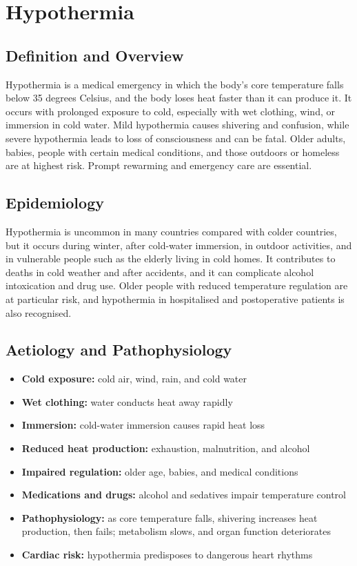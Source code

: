 \chapter{Hypothermia}

\section*{Definition and Overview}
Hypothermia is a medical emergency in which the body's core temperature falls below 35 degrees Celsius, and the body loses heat faster than it can produce it. It occurs with prolonged exposure to cold, especially with wet clothing, wind, or immersion in cold water. Mild hypothermia causes shivering and confusion, while severe hypothermia leads to loss of consciousness and can be fatal. Older adults, babies, people with certain medical conditions, and those outdoors or homeless are at highest risk. Prompt rewarming and emergency care are essential.

\section*{Epidemiology}
Hypothermia is uncommon in many countries compared with colder countries, but it occurs during winter, after cold-water immersion, in outdoor activities, and in vulnerable people such as the elderly living in cold homes. It contributes to deaths in cold weather and after accidents, and it can complicate alcohol intoxication and drug use. Older people with reduced temperature regulation are at particular risk, and hypothermia in hospitalised and postoperative patients is also recognised.

\section*{Aetiology and Pathophysiology}
\begin{itemize}
    \item \textbf{Cold exposure:} cold air, wind, rain, and cold water
    \item \textbf{Wet clothing:} water conducts heat away rapidly
    \item \textbf{Immersion:} cold-water immersion causes rapid heat loss
    \item \textbf{Reduced heat production:} exhaustion, malnutrition, and alcohol
    \item \textbf{Impaired regulation:} older age, babies, and medical conditions
    \item \textbf{Medications and drugs:} alcohol and sedatives impair temperature control
    \item \textbf{Pathophysiology:} as core temperature falls, shivering increases heat production, then fails; metabolism slows, and organ function deteriorates
    \item \textbf{Cardiac risk:} hypothermia predisposes to dangerous heart rhythms
\end{itemize}

